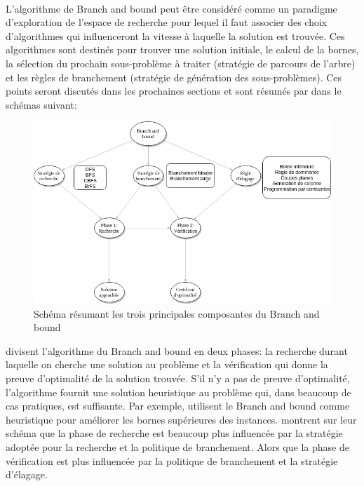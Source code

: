 \documentclass[12pt,a4paper,oneside]{book}
\theoremstyle{definition}
\begin{document}
	\paragraph{}
	L'algorithme de Branch and bound peut être considéré comme un paradigme d'exploration de l'espace de recherche pour lequel il faut associer des choix d'algorithmes qui influenceront la vitesse à laquelle la solution est trouvée. Ces algorithmes sont destinés pour trouver une solution initiale, le calcul de la bornes, la sélection du prochain sous-problème à traiter (stratégie de parcours de l'arbre) et les règles de branchement (stratégie de génération des sous-problèmes). Ces points seront discutés dans les prochaines sections et sont résumés par \cite{MORRISON201679} dans le schémas suivant:
	\begin{figure}[H]
		\centering
		\includegraphics[width=1\linewidth]{bb_stagegies}
		\caption{Schéma résumant les trois principales composantes du Branch and bound}
		\label{fig:bbstagegies}
	\end{figure}
	\cite{MORRISON201679} divisent l'algorithme du Branch and bound en deux phases: la recherche durant laquelle on cherche une solution au problème et la vérification qui donne la preuve d'optimalité de la solution trouvée. S'il n'y a pas de preuve d'optimalité, l'algorithme fournit une solution heuristique au problème qui, dans beaucoup de cas pratiques, est suffisante. Par exemple, \cite{Morrison2014} utilisent le Branch and bound comme heuristique pour améliorer les bornes supérieures des instances. \cite{MORRISON201679} montrent sur leur schéma que la phase de recherche est beaucoup plus influencée par la stratégie adoptée pour la recherche et la politique de branchement. Alors que la phase de vérification est plus influencée par la politique de branchement et la stratégie d'élagage.
	
\end{document}
